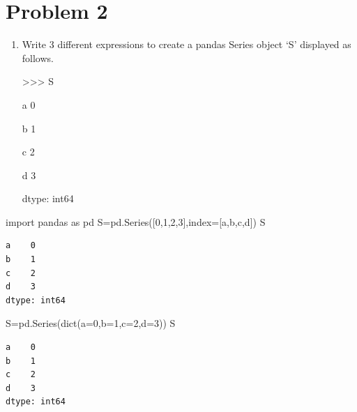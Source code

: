 \documentclass[
  a4paper,
  DIV=11,
  numbers=noendperiod]{scrreprt}
\newenvironment{Shaded}{\begin{snugshade}}{\end{snugshade}}
\newcommand{\BuiltInTok}[1]{\textcolor[rgb]{0.00,0.23,0.31}{#1}}
\newcommand{\DecValTok}[1]{\textcolor[rgb]{0.68,0.00,0.00}{#1}}
\newcommand{\ImportTok}[1]{\textcolor[rgb]{0.00,0.46,0.62}{#1}}
\newcommand{\NormalTok}[1]{\textcolor[rgb]{0.00,0.23,0.31}{#1}}
\newcommand{\OperatorTok}[1]{\textcolor[rgb]{0.37,0.37,0.37}{#1}}
\newcommand{\StringTok}[1]{\textcolor[rgb]{0.13,0.47,0.30}{#1}}
\begin{document}
\section*{Problem 2}\label{problem-2}


\begin{enumerate}
\def\labelenumi{\arabic{enumi}.}
\setcounter{enumi}{1}
\item
  Write 3 different expressions to create a pandas Series object `S'
  displayed as follows.

  \textgreater\textgreater\textgreater{} S

  a 0

  b 1

  c 2

  d 3

  dtype: int64
\end{enumerate}

\begin{Shaded}
\begin{Highlighting}[]
\ImportTok{import}\NormalTok{ pandas }\ImportTok{as}\NormalTok{ pd}
\NormalTok{S}\OperatorTok{=}\NormalTok{pd.Series([}\DecValTok{0}\NormalTok{,}\DecValTok{1}\NormalTok{,}\DecValTok{2}\NormalTok{,}\DecValTok{3}\NormalTok{],index}\OperatorTok{=}\NormalTok{[}\StringTok{\textquotesingle{}a\textquotesingle{}}\NormalTok{,}\StringTok{\textquotesingle{}b\textquotesingle{}}\NormalTok{,}\StringTok{\textquotesingle{}c\textquotesingle{}}\NormalTok{,}\StringTok{\textquotesingle{}d\textquotesingle{}}\NormalTok{])}
\NormalTok{S}
\end{Highlighting}
\end{Shaded}

\begin{verbatim}
a    0
b    1
c    2
d    3
dtype: int64
\end{verbatim}

\begin{Shaded}
\begin{Highlighting}[]
\NormalTok{S}\OperatorTok{=}\NormalTok{pd.Series(}\BuiltInTok{dict}\NormalTok{(a}\OperatorTok{=}\DecValTok{0}\NormalTok{,b}\OperatorTok{=}\DecValTok{1}\NormalTok{,c}\OperatorTok{=}\DecValTok{2}\NormalTok{,d}\OperatorTok{=}\DecValTok{3}\NormalTok{))}
\NormalTok{S}
\end{Highlighting}
\end{Shaded}

\begin{verbatim}
a    0
b    1
c    2
d    3
dtype: int64
\end{verbatim}
\end{document}
